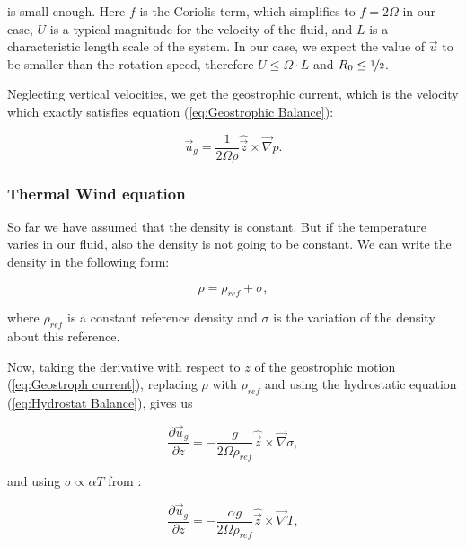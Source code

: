 \documentclass[12pt, a4paper]{article} %
\begin{document}
		is small enough. Here $f$ is the Coriolis term, which simplifies to $f=2\Omega$ in our case, $U$ is a typical magnitude for the velocity of the fluid, and $L$ is a characteristic length scale of the system. In our case, we expect the value of $\vec{u}$ to be smaller than the rotation speed, therefore $U \leq \Omega \cdot L$ and $R_0 \leq \nicefrac{1}{2}$.
		
		Neglecting vertical velocities, we get the geostrophic current, which is the velocity which exactly satisfies equation (\ref{eq:Geostrophic Balance}):
		
		\begin{equation}
			\vec{u}_g = \frac{1}{2\Omega \rho} \hat{\vec{z}} \times \vec{\nabla}p .
			\label{eq:Geostroph current}
		\end{equation}
		
		\subsubsection{Thermal Wind equation}
			So far we have assumed that the density is constant. But if the temperature varies in our fluid, also the density is not going to be constant. We can write the density in the following form:
			
			\begin{equation}
				\rho = \rho_{ref} + \sigma ,
				\label{eq:Density}
			\end{equation} 
		
		where $\rho_{ref}$ is a constant reference density and $\sigma$ is the variation of the density about this reference. %
		
		Now, taking the derivative with respect to $z$ of the geostrophic motion (\ref{eq:Geostroph current}), replacing $\rho$ with $\rho_{ref}$ and using the hydrostatic equation (\ref{eq:Hydrostat Balance}), gives us
		
		\begin{equation}
			\frac{\partial \vec{u}_g}{\partial z} = - \frac{g}{2\Omega \rho_{ref}} \hat{\vec{z}} \times \vec{\nabla} \sigma ,
		\end{equation}
		
		and using $\sigma \propto \alpha T$ from \cite{Marshall1965}:
		
		\begin{equation}
			\frac{\partial \vec{u}_g}{\partial z} = - \frac{\alpha g}{2\Omega \rho_{ref}} \hat{\vec{z}} \times \vec{\nabla} T ,
		\end{equation}
		
\end{document}
